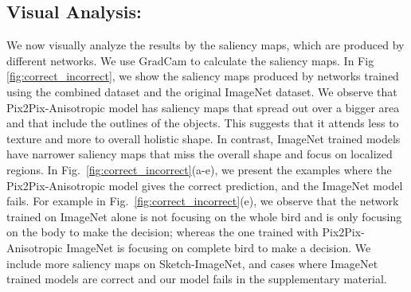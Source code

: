 \documentclass{bmvc2k}
\begin{document}
\subsection{Visual Analysis:}
We now visually analyze the results by the saliency maps, which are produced by different networks. We use GradCam \cite{Selvaraju2016GradCAMVE} to calculate the saliency maps. In Fig \ref{fig:correct_incorrect}, we show the saliency maps produced by networks trained using the combined dataset and the original ImageNet dataset. 
We observe that Pix2Pix-Anisotropic model has saliency maps that spread out over a bigger area and that include the outlines of the objects. This suggests that it attends less to texture and more to overall holistic shape. In contrast, ImageNet trained models have narrower saliency maps that miss the overall shape and focus on localized regions.
In Fig.~\ref{fig:correct_incorrect}(a-e), we present the examples where the Pix2Pix-Anisotropic model gives the correct prediction, and the ImageNet model fails.
For example in Fig.~\ref{fig:correct_incorrect}(e), we observe that the network trained on ImageNet alone is not focusing on the whole bird and is only focusing on the body to make the decision; whereas the one trained with Pix2Pix-Anisotropic ImageNet is focusing on complete bird to make a decision. We include more saliency maps on Sketch-ImageNet, and cases where ImageNet trained models are correct and our model fails in the supplementary material.
\end{document}
